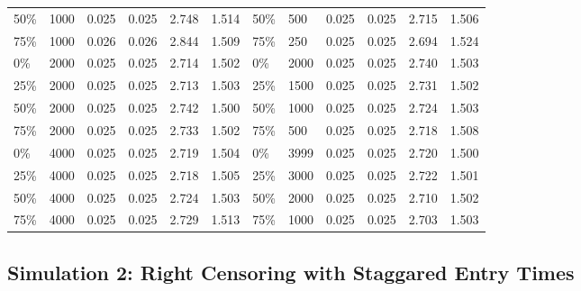 \documentclass[12pt,letterpaper]{article}
\begin{document}
\begin{table}[!htbp]
\begin{tabular}{@{}C{1.8cm}lllll||C{1.8cm}lllll@{}}
 		50\% & 1000   & 0.025  & 0.025 & 2.748 & 1.514 & 50\%  & 500  & 0.025 & 0.025 & 2.715 & 1.506 \\
 		75\% & 1000   & 0.026  & 0.026 & 2.844 & 1.509 & 75\%  & 250  & 0.025 & 0.025 & 2.694 & 1.524 \\
 		0\%  & 2000   & 0.025  & 0.025 & 2.714 & 1.502 & 0\%   & 2000 & 0.025 & 0.025 & 2.740 & 1.503 \\
 		25\% & 2000   & 0.025  & 0.025 & 2.713 & 1.503 & 25\%  & 1500 & 0.025 & 0.025 & 2.731 & 1.502 \\
 		50\% & 2000   & 0.025  & 0.025 & 2.742 & 1.500 & 50\%  & 1000 & 0.025 & 0.025 & 2.724 & 1.503 \\
 		75\% & 2000   & 0.025  & 0.025 & 2.733 & 1.502 & 75\%  & 500  & 0.025 & 0.025 & 2.718 & 1.508 \\
 		0\%  & 4000   & 0.025  & 0.025 & 2.719 & 1.504 & 0\%   & 3999 & 0.025 & 0.025 & 2.720 & 1.500 \\
 		25\% & 4000   & 0.025  & 0.025 & 2.718 & 1.505 & 25\%  & 3000 & 0.025 & 0.025 & 2.722 & 1.501 \\
 		50\% & 4000   & 0.025  & 0.025 & 2.724 & 1.503 & 50\%  & 2000 & 0.025 & 0.025 & 2.710 & 1.502 \\
 		75\% & 4000  & 0.025 & 0.025  & 2.729 & 1.513 & 75\%  & 1000  & 0.025  & 0.025 & 2.703 & 1.503 \\ \bottomrule
 	\end{tabular}
 	\label{tab:rightcensor}%
 \end{table}



\subsection{Simulation 2: Right Censoring with Staggared Entry Times} \label{rightcensor:sim2}
\end{document}
